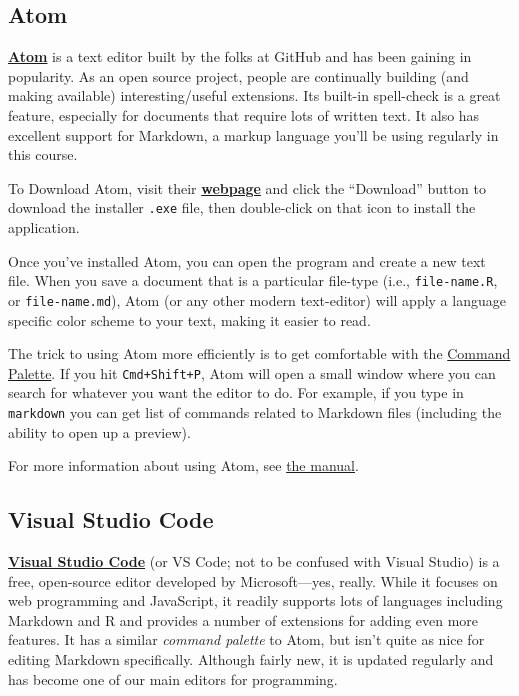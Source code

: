 \documentclass[]{book}
\theoremstyle{definition}
\theoremstyle{definition}
\theoremstyle{remark}
\begin{document}
\subsection{Atom}\label{atom}

\href{https://atom.io/}{\textbf{Atom}} is a text editor built by the
folks at GitHub and has been gaining in popularity. As an open source
project, people are continually building (and making available)
interesting/useful extensions. Its built-in spell-check is a great
feature, especially for documents that require lots of written text. It
also has excellent support for Markdown, a markup language you'll be
using regularly in this course.

To Download Atom, visit their \href{https://atom.io/}{\textbf{webpage}}
and click the ``Download'' button to download the installer
\texttt{.exe} file, then double-click on that icon to install the
application.

Once you've installed Atom, you can open the program and create a new
text file. When you save a document that is a particular file-type
(i.e., \texttt{file-name.R}, or \texttt{file-name.md}), Atom (or any
other modern text-editor) will apply a language specific color scheme to
your text, making it easier to read.

The trick to using Atom more efficiently is to get comfortable with the
\href{http://flight-manual.atom.io/getting-started/sections/atom-basics/\#command-palette}{Command
Palette}. If you hit \texttt{Cmd+Shift+P}, Atom will open a small window
where you can search for whatever you want the editor to do. For
example, if you type in \texttt{markdown} you can get list of commands
related to Markdown files (including the ability to open up a preview).

For more information about using Atom, see
\href{http://flight-manual.atom.io/}{the manual}.

\subsection{Visual Studio Code}\label{visual-studio-code}

\href{https://code.visualstudio.com/}{\textbf{Visual Studio Code}} (or
VS Code; not to be confused with Visual Studio) is a free, open-source
editor developed by Microsoft---yes, really. While it focuses on web
programming and JavaScript, it readily supports lots of languages
including Markdown and R and provides a number of extensions for adding
even more features. It has a similar \emph{command palette} to Atom, but
isn't quite as nice for editing Markdown specifically. Although fairly
new, it is updated regularly and has become one of our main editors for
programming.
\end{document}
